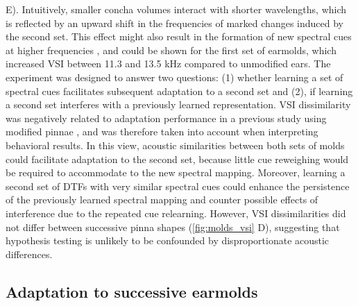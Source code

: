 E). Intuitively, smaller concha volumes interact with shorter wavelengths, which is reflected by an upward shift in the frequencies of marked changes induced by the second set. This effect might also result in the formation of new spectral cues at higher frequencies \citep{wanrooij_relearning_2005}, and could be shown for the first set of earmolds, which increased VSI between 11.3 and 13.5 kHz compared to unmodified ears. The experiment was designed to answer two questions: (1) whether learning a set of spectral cues facilitates subsequent adaptation to a second set and (2), if learning a second set interferes with a previously learned representation. VSI dissimilarity was negatively related to adaptation performance in a previous study using modified pinnae \citep{trapeau_fast_2016}, and was therefore taken into account when interpreting behavioral results. In this view, acoustic similarities between both sets of molds could facilitate adaptation to the second set, because little cue reweighing would be required to accommodate to the new spectral mapping. Moreover, learning a second set of DTFs with very similar spectral cues could enhance the persistence of the previously learned spectral mapping and counter possible effects of interference due to the repeated cue relearning. However, VSI dissimilarities did not differ between successive pinna shapes (\cref{fig:molds_vsi} D), suggesting that hypothesis testing is unlikely to be confounded by disproportionate acoustic differences. 

\subsection{Adaptation to successive earmolds}

